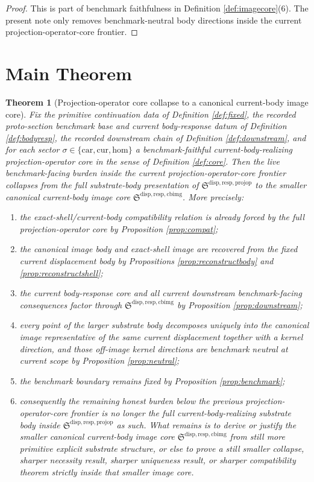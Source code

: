 \documentclass[11pt]{article}
\newcommand{\Car}{\mathrm{car}}
\newcommand{\Cur}{\mathrm{cur}}
\newcommand{\Hom}{\mathrm{hom}}
\newcommand{\ProjectionOperatorCore}{\mathfrak S^{\mathrm{disp,resp,projop}}}
\newcommand{\CurrentBodyImageCore}{\mathfrak S^{\mathrm{disp,resp,cbimg}}}
\newtheorem{theorem}{Theorem}
\begin{document}
\begin{proof}
This is part of benchmark faithfulness in Definition \ref{def:imagecore}(6). The present note only removes benchmark-neutral body directions inside the current projection-operator-core frontier.
\end{proof}

\section{Main Theorem}

\begin{theorem}[Projection-operator core collapse to a canonical current-body image core]
\label{thm:main}
Fix the primitive continuation data of Definition \ref{def:fixed}, the recorded proto-section benchmark base and current body-response datum of Definition \ref{def:bodyresp}, the recorded downstream chain of Definition \ref{def:downstream}, and for each sector \(\sigma\in\{\Car,\Cur,\Hom\}\) a benchmark-faithful current-body-realizing projection-operator core in the sense of Definition \ref{def:core}. Then the live benchmark-facing burden inside the current projection-operator-core frontier collapses from the full substrate-body presentation of \(\ProjectionOperatorCore\) to the smaller canonical current-body image core \(\CurrentBodyImageCore\). More precisely:
\begin{enumerate}
    \item the exact-shell/current-body compatibility relation is already forced by the full projection-operator core by Proposition \ref{prop:compat};
    \item the canonical image body and exact-shell image are recovered from the fixed current displacement body by Propositions \ref{prop:reconstructbody} and \ref{prop:reconstructshell};
    \item the current body-response core and all current downstream benchmark-facing consequences factor through \(\CurrentBodyImageCore\) by Proposition \ref{prop:downstream};
    \item every point of the larger substrate body decomposes uniquely into the canonical image representative of the same current displacement together with a kernel direction, and those off-image kernel directions are benchmark neutral at current scope by Proposition \ref{prop:neutral};
    \item the benchmark boundary remains fixed by Proposition \ref{prop:benchmark};
    \item consequently the remaining honest burden below the previous projection-operator-core frontier is no longer the full current-body-realizing substrate body inside \(\ProjectionOperatorCore\) as such. What remains is to derive or justify the smaller canonical current-body image core \(\CurrentBodyImageCore\) from still more primitive explicit substrate structure, or else to prove a still smaller collapse, sharper necessity result, sharper uniqueness result, or sharper compatibility theorem strictly inside that smaller image core.
\end{enumerate}
\end{theorem}
\end{document}
